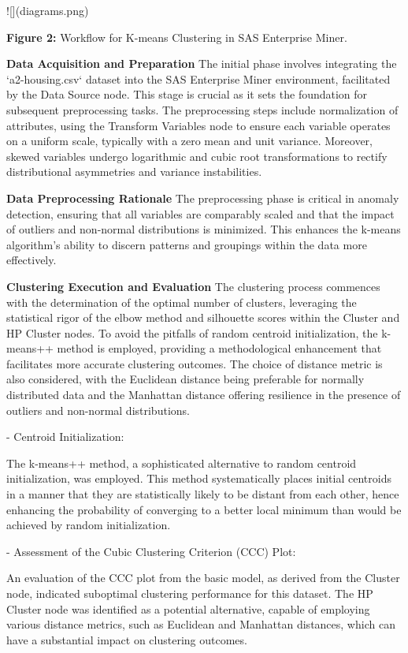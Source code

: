 \documentclass{sigkddExp}
\begin{document}
![](diagrams.png)

\textbf{Figure 2:} Workflow for K-means Clustering in SAS Enterprise Miner.

\textbf{Data Acquisition and Preparation}
The initial phase involves integrating the `a2-housing.csv` dataset into the SAS Enterprise Miner environment, facilitated by the Data Source node. This stage is crucial as it sets the foundation for subsequent preprocessing tasks. The preprocessing steps include normalization of attributes, using the Transform Variables node to ensure each variable operates on a uniform scale, typically with a zero mean and unit variance. Moreover, skewed variables undergo logarithmic and cubic root transformations to rectify distributional asymmetries and variance instabilities.

\textbf{Data Preprocessing Rationale}
The preprocessing phase is critical in anomaly detection, ensuring that all variables are comparably scaled and that the impact of outliers and non-normal distributions is minimized. This enhances the k-means algorithm's ability to discern patterns and groupings within the data more effectively.

\textbf{Clustering Execution and Evaluation}
The clustering process commences with the determination of the optimal number of clusters, leveraging the statistical rigor of the elbow method and silhouette scores within the Cluster and HP Cluster nodes. To avoid the pitfalls of random centroid initialization, the k-means++ method is employed, providing a methodological enhancement that facilitates more accurate clustering outcomes. The choice of distance metric is also considered, with the Euclidean distance being preferable for normally distributed data and the Manhattan distance offering resilience in the presence of outliers and non-normal distributions.

- Centroid Initialization:

The k-means++ method, a sophisticated alternative to random centroid initialization, was employed. This method systematically places initial centroids in a manner that they are statistically likely to be distant from each other, hence enhancing the probability of converging to a better local minimum than would be achieved by random initialization.

- Assessment of the Cubic Clustering Criterion (CCC) Plot:

An evaluation of the CCC plot from the basic model, as derived from the Cluster node, indicated suboptimal clustering performance for this dataset. The HP Cluster node was identified as a potential alternative, capable of employing various distance metrics, such as Euclidean and Manhattan distances, which can have a substantial impact on clustering outcomes.
\end{document}

